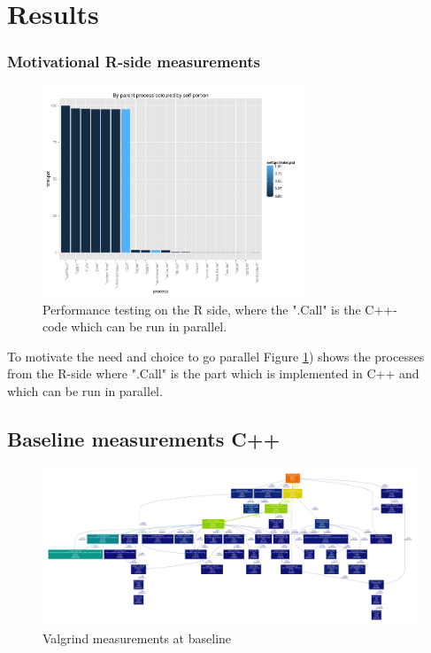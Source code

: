 \section{Results}

\subsubsection{Motivational R-side measurements}

\begin{figure}[!htbp]
  \centering
  \includegraphics[width=0.7\textwidth]{images/parentColByPortion.pdf}
  \caption{Performance testing on the R side, where the ".Call" is
    the C++-code which can be run in parallel.}
  \label{fig:Rself}
\end{figure}

To motivate the need and choice to go parallel Figure \ref{fig:Rself})
shows the processes from the R-side where ".Call" is the part
which is implemented in C++ and which can be run in parallel.

\subsection{Baseline measurements C++}

\begin{figure}[!htbp]
  \centering
  \includegraphics[height=0.50\textheight, angle=90]{images/profBaseLine.pdf}
  \caption{Valgrind measurements at baseline}
  \label{fig:simpleOpenMP}
\end{figure}


